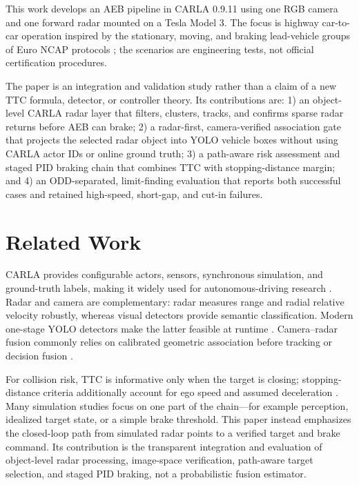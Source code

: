 \documentclass[conference]{IEEEtran}
\begin{document}
This work develops an AEB pipeline in CARLA 0.9.11 using one RGB camera and one
forward radar mounted on a Tesla Model 3. The focus is highway car-to-car
operation inspired by the stationary, moving, and braking lead-vehicle groups
of Euro NCAP protocols \cite{euroncap_aeb}; the scenarios are engineering tests,
not official certification procedures.

The paper is an integration and validation study rather than a claim of a new
TTC formula, detector, or controller theory. Its contributions are: 1) an
object-level CARLA radar layer that filters, clusters, tracks, and confirms
sparse radar returns before AEB can brake; 2) a radar-first, camera-verified
association gate that projects the selected radar object into YOLO vehicle boxes
without using CARLA actor IDs or online ground truth; 3) a path-aware risk
assessment and staged PID braking chain that combines TTC with stopping-distance
margin; and 4) an ODD-separated, limit-finding evaluation that reports both
successful cases and retained high-speed, short-gap, and cut-in failures.

\section{Related Work}
CARLA provides configurable actors, sensors, synchronous simulation, and
ground-truth labels, making it widely used for autonomous-driving research
\cite{dosovitskiy2017carla,carla_sensors}. Radar and camera are complementary:
radar measures range and radial relative velocity robustly, whereas visual
detectors provide semantic classification. Modern one-stage YOLO detectors make
the latter feasible at runtime \cite{ultralytics_yolo}. Camera--radar fusion commonly relies
on calibrated geometric association before tracking or decision fusion
\cite{feng2021multimodal}.

For collision risk, TTC is informative only when the target is closing;
stopping-distance criteria additionally account for ego speed and assumed
deceleration \cite{iso15623}. Many simulation studies focus on one part of the
chain---for example perception, idealized target state, or a simple brake
threshold. This paper instead emphasizes the closed-loop path from simulated
radar points to a verified target and brake command. Its contribution is the
transparent integration and evaluation of object-level radar processing,
image-space verification, path-aware target selection, and staged PID braking,
not a probabilistic fusion estimator.
\end{document}
